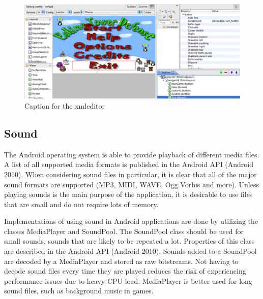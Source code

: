 \begin{figure}[here]
\begin{center}
\includegraphics[scale=0.3]{pics/chapters/chapter2/xmleditor}
\end{center}

\caption{Caption for the xmleditor}
\label{fig:xmlEditor}

\end{figure}

\subsection{Sound}

The Android operating system is able to provide playback of different media files. A list of all supported media formats is published in the Android API (Android 2010). When considering sound files in particular, it is clear that all of the major sound formats are supported (MP3, MIDI, WAVE, Ogg Vorbis and more). Unless playing sounds is the main purpose of the application, it is desirable to use files that are small and do not require lots of memory. 

Implementations of using sound in Android applications are done by utilizing the classes MediaPlayer and SoundPool. The SoundPool class should be used for small sounds, sounds that are likely to be repeated a lot. Properties of this class are described in the Android API (Android 2010). Sounds added to a SoundPool are decoded by a MediaPlayer and stored as raw bitstreams. Not having to decode sound files every time they are played reduces the risk of experiencing performance issues due to heavy CPU load. MediaPlayer is better used for long sound files, such as background music in games. 
